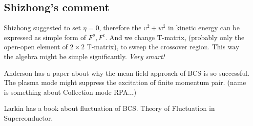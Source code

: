 \subsection{Shizhong's comment}

Shizhong suggested to set $\eta=0$, therefore the $v^2+w^2$ in kinetic energy can be expressed as simple form of $F^o, F^c$. And we change T-matrix, (probably only the open-open element of $2\times2$ T-matrix), to sweep the crossover region.  This way the algebra might be simple significantly.  \emph{Very smart!}

Anderson has a paper about why the mean field approach of BCS is so successful.  The plasma mode might suppress the excitation of finite momentum pair.  (name is something about Collection mode RPA...)

Larkin has a book about fluctuation of BCS.  Theory of Fluctuation in Superconductor.  
